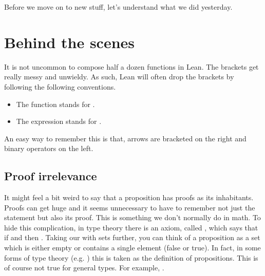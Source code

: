\documentclass[letterpaper,10pt,english]{sphinxmanual}
\begin{document}
\sphinxAtStartPar
Before we move on to new stuff, let’s understand what we did yesterday.


\section{Behind the scenes}
\label{\detokenize{day2:behind-the-scenes}}
\sphinxAtStartPar
{}
It is not uncommon to compose half a dozen functions in Lean.
The brackets get really messy and unwieldy.
As such, Lean will often drop the brackets by following the following conventions.
\begin{itemize}
\item {} 
\sphinxAtStartPar
The function  stands for .

\item {} 
\sphinxAtStartPar
The expression  stands for .

\end{itemize}

\sphinxAtStartPar
An easy way to remember this is that, arrows are bracketed on the right and binary operators on the left.


\subsection{Proof irrelevance}
\label{\detokenize{day2:proof-irrelevance}}
\sphinxAtStartPar
It might feel a bit weird to say that a proposition has proofs as its inhabitants.
Proofs can get huge and it seems unnecessary to have to remember not just the statement but also its proof.
This is something we don’t normally do in math.
To hide this complication, in type theory there is an axiom, called , which says that
if  and  then .
Taking our  with sets further, you can think of a proposition as a set which is either empty or contains a single element (false or true).
In fact, in some forms of type theory (e.g. ) this is taken as the definition of propositions.
This is of course not true for general types.
For example, .
\end{document}
